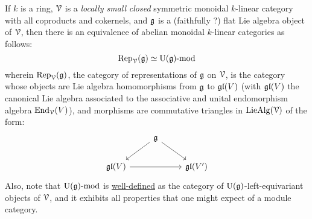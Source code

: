             \begin{theorem}
                If $k$ is a ring, $\mathcal{V}$ is a \textit{locally small} \textit{closed} symmetric monoidal $k$-linear category with all coproducts and cokernels, and $\mathfrak{g}$ is a (faithfully ?) flat Lie algebra object of $\mathcal{V}$, then there is an equivalence of abelian monoidal $k$-linear categories as follows:
                    $$\mathrm{Rep}_{\mathcal{V}}(\mathfrak{g}) \simeq {\mathrm{U}(\mathfrak{g})}\text{-}\mathrm{mod}$$
                wherein $\mathrm{Rep}_{\mathcal{V}}(\mathfrak{g})$, the category of representations of $\mathfrak{g}$ on $\mathcal{V}$, is the category whose objects are Lie algebra homomorphisms from $\mathfrak{g}$ to $\mathfrak{gl}(V)$ (with $\mathfrak{gl}(V)$ the canonical Lie algebra associated to the associative and unital endomorphism algebra $\mathrm{End}_{\mathcal{V}}(V)$), and morphisms are commutative triangles in $\mathrm{Lie}\mathrm{Alg}(\mathcal{V})$ of the form:
                    $$
                        \begin{tikzcd}
                        	& {\g} \\
                        	{\frakgl(V)} && {\frakgl(V')}
                        	\arrow[from=2-1, to=2-3]
                        	\arrow[from=1-2, to=2-1]
                        	\arrow[from=1-2, to=2-3]
                        \end{tikzcd}
                    $$
                Also, note that ${\mathrm{U}(\mathfrak{g})}\text{-}\mathrm{mod}$ is \href{https://ncatlab.org/nlab/show/module+over+a+monoid}{\underline{well-defined}} as the category of $\mathrm{U}(\mathfrak{g})$-left-equivariant objects of $\mathcal{V}$, and it exhibits all properties that one might expect of a module category.
            \end{theorem}
